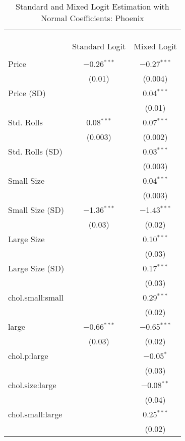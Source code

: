 
\begin{table}[!htbp] \centering 
  \caption{Standard and Mixed Logit Estimation with Normal Coefficients: Phoenix} 
  \label{tab:mnlPhoenixBaseline} 
\begin{tabular}{@{\extracolsep{5pt}}lcc} 
\\[-1.8ex]\hline 
\hline \\[-1.8ex] 
\\[-1.8ex] & \multicolumn{2}{c}{} \\ 
 & Standard Logit & Mixed Logit \\ 
\hline \\[-1.8ex] 
 Price & $-$0.26$^{***}$ & $-$0.27$^{***}$ \\ 
  & (0.01) & (0.004) \\ 
  Price (SD) &  & 0.04$^{***}$ \\ 
  &  & (0.01) \\ 
  Std. Rolls & 0.08$^{***}$ & 0.07$^{***}$ \\ 
  & (0.003) & (0.002) \\ 
  Std. Rolls (SD) &  & 0.03$^{***}$ \\ 
  &  & (0.003) \\ 
  Small Size &  & 0.04$^{***}$ \\ 
  &  & (0.003) \\ 
  Small Size (SD) & $-$1.36$^{***}$ & $-$1.43$^{***}$ \\ 
  & (0.03) & (0.02) \\ 
  Large Size &  & 0.10$^{***}$ \\ 
  &  & (0.03) \\ 
  Large Size (SD) &  & 0.17$^{***}$ \\ 
  &  & (0.03) \\ 
  chol.small:small &  & 0.29$^{***}$ \\ 
  &  & (0.02) \\ 
  large & $-$0.66$^{***}$ & $-$0.65$^{***}$ \\ 
  & (0.03) & (0.02) \\ 
  chol.p:large &  & $-$0.05$^{*}$ \\ 
  &  & (0.03) \\ 
  chol.size:large &  & $-$0.08$^{**}$ \\ 
  &  & (0.04) \\ 
  chol.small:large &  & 0.25$^{***}$ \\ 
  &  & (0.02) \\ 

\end{tabular}
\end{table}
